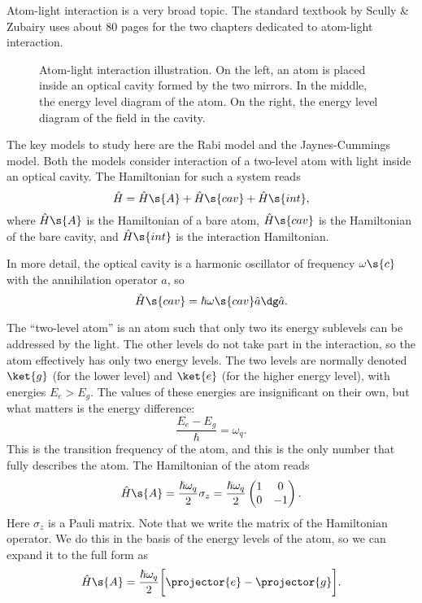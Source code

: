 \documentclass[fontsize=9pt,bookmarkpackage=false]{scrartcl}
\renewcommand{\hbar}{\hslash}
\newcommand{\inputtikz}[1]{%
  \tikzsetnextfilename{#1}%
}
\begin{document}
Atom-light interaction is a very broad topic.
The standard textbook by Scully \& Zubairy uses about 80 pages for the two chapters dedicated to atom-light interaction.

\begin{figure}[htb]%
  \centering
  \inputtikz{atom-cavity}
  \caption{Atom-light interaction illustration.
    On the left, an atom is placed inside an optical cavity formed by the two mirrors.
    In the middle, the energy level diagram of the atom.
  On the right, the energy level diagram of the field in the cavity.}
  \label{fig:atom:light:int}
\end{figure}%

The key models to study here are the Rabi model and the Jaynes-Cummings model.
Both the models consider interaction of a two-level atom with light inside an optical cavity.
The Hamiltonian for such a system reads
\begin{equation}
  \hat H = \hat H\s{A} + \hat H\s{cav} + \hat H\s{int},
\end{equation}
where $\hat H\s{A}$ is the Hamiltonian of a bare atom,
$\hat H\s{cav}$ is the Hamiltonian of the bare cavity, and $\hat H\s{int}$ is the interaction Hamiltonian.

In more detail, the optical cavity is a harmonic oscillator of frequency $\omega\s{c}$ with the annihilation operator $\hat a$, so
\begin{equation}
  \hat H\s{cav} = \hbar \omega\s{cav} \hat a\dg \hat a.
\end{equation}

The ``two-level atom'' is an atom such that only two its energy sublevels can be addressed by the light.
The other levels do not take part in the interaction, so the atom effectively has only two energy levels.
The two levels are normally denoted $\ket{g}$ (for the lower level) and $\ket{e}$ (for the higher energy level), with energies $E_e > E_g$.
The values of these energies are insignificant on their own, but what matters is the energy difference:
\begin{equation}
  \frac{ E_e - E_g }{ \hbar } = \omega_q.
\end{equation}
This is the transition frequency of the atom, and this is the only number that fully describes the atom.
The Hamiltonian of the atom reads
\begin{equation}
  \hat H\s{A}
  = \frac{ \hbar \omega_q }{ 2 } \sigma_z
  = \frac{ \hbar \omega_q }{ 2 }
  \begin{pmatrix}
    1 & 0 \\ 0 & - 1
  \end{pmatrix}.
\end{equation}
Here $\sigma_z$ is a Pauli matrix.
Note that we write the matrix of the Hamiltonian operator.
We do this in the basis of the energy levels of the atom, so we can expand it to the full form as
\begin{equation}
  \hat H\s{A}
  = \frac{ \hbar \omega_q }{ 2 }
  \bigg[ \projector{e} -  \projector{g} \bigg].
\end{equation}
\end{document}
